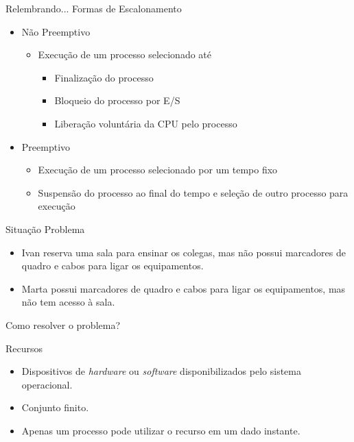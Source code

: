 \documentclass[aspectratio=169,
				xcolor=table]{beamer}
\begin{document}
	\begin{frame}{Relembrando...}
		\alert{Formas de Escalonamento}
		\begin{itemize}
			\item Não Preemptivo
			\begin{itemize}
				\item Execução de um processo selecionado até
				\begin{itemize}
					\item Finalização do processo
					\item Bloqueio do processo por E/S
					\item Liberação voluntária da CPU pelo processo
				\end{itemize}
			\end{itemize}
			\vspace{1em}			
			\item Preemptivo
			\begin{itemize}
				\item Execução de um processo selecionado por um tempo fixo
				\item Suspensão do processo ao final do tempo e seleção de outro processo para execução
			\end{itemize}
		\end{itemize}	
	\end{frame}
	
	\begin{frame}{Situação Problema}
		\begin{itemize}
			\item Ivan reserva uma sala para ensinar os colegas, mas não possui marcadores de quadro e cabos para ligar os equipamentos.
			\vspace{1em}
			\item Marta possui marcadores de quadro e cabos para ligar os equipamentos, mas não tem acesso à sala.
		\end{itemize}
		\vspace{2em}
		\Huge \centering \alert{Como resolver o problema?}
	\end{frame}

	\begin{frame}{Recursos}
		\begin{itemize}
			\item Dispositivos de \textit{hardware} ou \textit{software} disponibilizados pelo sistema operacional.
			\vspace{1em}
			\item Conjunto finito.
			\vspace{1em}
			\item Apenas um processo pode utilizar o recurso em um dado instante.
		\end{itemize}
	\end{frame}	
\end{document}
